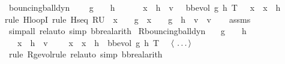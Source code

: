 \documentclass[envcountsame,envcountsect]{llncs}
\begin{document}
\begin{example}
\begin{isabellebody}
\isanewline
{}\isamarkupfalse%
\ bouncing{\isacharunderscore}ball{\isacharunderscore}dyn{\isacharcolon}\ \isanewline
\ \ \ {\isachardoublequoteopen}g\ {\isacharless}\ {}{\isachardoublequoteclose}\ \ {\isachardoublequoteopen}h\ {\isasymge}\ {}{\isachardoublequoteclose}\isanewline
\ \ \ {\isachardoublequoteopen}\ \isactrlbold {\isacharbraceleft}x\ {\isacharequal}\ h\ {\isasymand}\ v\ {\isacharequal}\ {}\isactrlbold {\isacharbraceright}\ bb{\isacharunderscore}evol\ g\ h\ T\ \ {\isasymle}\ x\ {\isasymand}\ x\ {\isasymle}\ h\isactrlbold {\isacharbraceright}{\isachardoublequoteclose}\isanewline
{}\isamarkupfalse%
{\isacharparenleft}rule\ H{\isacharunderscore}loopI{\isacharcomma}\ rule\ H{\isacharunderscore}seq{\isacharbrackleft}\ R{\isacharequal}{\isachardoublequoteopen}U{\isacharparenleft}{}\ {\isasymle}\ x\ {\isasymand}\ {}\ {\isasymcdot}\ g\ {\isasymcdot}\ x\ {\isacharequal}\ {}\ {\isasymcdot}\ g\ {\isasymcdot}\ h\ {\isacharplus}\ v\ {\isasymcdot}\ v{\isacharparenright}{\isachardoublequoteclose}{\isacharbrackright}{\isacharparenright}\isanewline
\ \ \isamarkupfalse%
\ assms\ \isamarkupfalse%
\ {\isacharparenleft}simp{\isacharunderscore}all{\isacharcomma}\ rel{\isacharunderscore}auto{\isacharprime}\ simp{\isacharcolon}\ bb{\isacharunderscore}real{\isacharunderscore}arith{\isacharparenright}\isanewline
\isanewline
{}\isamarkupfalse\ R{\isacharunderscore}bouncing{\isacharunderscore}ball{\isacharunderscore}dyn{\isacharcolon}\isanewline
\ \ \ {\isachardoublequoteopen}g\ {\isacharless}\ {}{\isachardoublequoteclose}\ \ {\isachardoublequoteopen}h\ {\isasymge}\ {}{\isachardoublequoteclose}\isanewline
\ \ \ {\isachardoublequoteopen}\isactrlbold {\isacharbrackleft}x\ {\isacharequal}\ h\ {\isasymand}\ v\ {\isacharequal}\ {}{\isacharcomma}\ {}\ {\isasymle}\ x\ {\isasymand}\ x\ {\isasymle}\ h\isactrlbold {\isacharbrackright}\ {\isasymge}\ bb{\isacharunderscore}evol\ g\ h\ T{\isachardoublequoteclose}\isanewline
\ \ $\langle \isa{\dots}\rangle$\ \isamarkupfalse%
\ {\isacharparenleft}rule\ R{\isacharunderscore}g{\isacharunderscore}evol{\isacharunderscore}rule{\isacharcomma}\ rel{\isacharunderscore}auto{\isacharprime}\ simp{\isacharcolon}\ bb{\isacharunderscore}real{\isacharunderscore}arith{\isacharparenright}\isanewline
\end{isabellebody}


\end{example}
\end{document}
